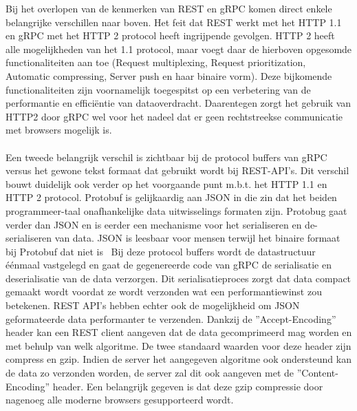 Bij het overlopen van de kenmerken van REST en gRPC komen direct enkele belangrijke verschillen naar boven.
Het feit dat REST werkt met het HTTP 1.1 en gRPC met het HTTP 2 protocol heeft ingrijpende gevolgen. HTTP 2 heeft alle mogelijkheden van het 1.1 protocol,
maar voegt daar de hierboven opgesomde functionaliteiten aan toe (Request multiplexing, Request prioritization, Automatic compressing,
Server push en haar binaire vorm). Deze bijkomende functionaliteiten zijn voornamelijk toegespitst op een verbetering van de performantie en effici\"entie van dataoverdracht.
Daarentegen zorgt het gebruik van HTTP2 door gRPC wel voor het nadeel dat er geen rechtstreekse communicatie met browsers mogelijk is.\newline
~\autocite{cloudflare}\\
~\autocite{tutsplus}\\

Een tweede belangrijk verschil is zichtbaar bij de protocol buffers van gRPC versus het gewone tekst formaat dat gebruikt wordt bij REST-API's.
Dit verschil bouwt duidelijk ook verder op het voorgaande punt m.b.t. het HTTP 1.1 en HTTP 2 protocol.
Protobuf is gelijkaardig aan JSON in die zin dat het beiden programmeer-taal onafhankelijke data uitwisselings formaten zijn.
Protobug gaat verder dan JSON en is eerder een mechanisme voor het serialiseren en de-serialiseren van data.
JSON is leesbaar voor mensen terwijl het binaire formaat bij Protobuf dat niet is~\parencite{json}
Bij deze protocol buffers wordt de datastructuur \'e\'enmaal vastgelegd en gaat de gegenereerde code van gRPC de serialisatie en deserialisatie van de data verzorgen.
Dit serialisatieproces zorgt dat data compact gemaakt wordt voordat ze wordt verzonden wat een performantiewinst zou betekenen.\newline
REST API's hebben echter ook de mogelijkheid om JSON geformateerde data performanter te verzenden. Dankzij de ''Accept-Encoding'' header kan een REST client aangeven
dat de data gecomprimeerd mag worden en met behulp van welk algoritme. De twee standaard waarden voor deze header zijn compress en gzip. Indien de server het aangegeven algoritme
ook ondersteund kan de data zo verzonden worden, de server zal dit ook aangeven met de ''Content-Encoding'' header. Een belangrijk gegeven is dat deze gzip compressie door
nagenoeg alle moderne browsers gesupporteerd wordt.
~\autocite{googleprotobufguide}\\
~\autocite{restcompression}\\
~\autocite{gzipBrowerSupport}\\

